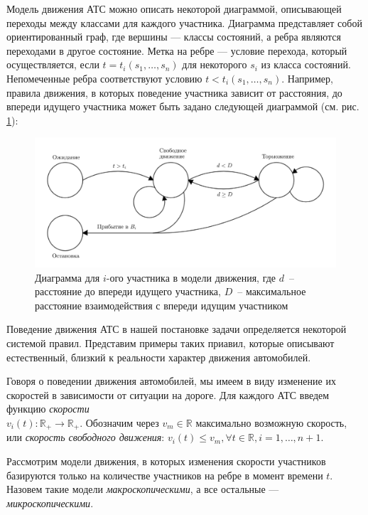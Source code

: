 \documentclass[12pt, a4paper]{article}
\begin{document}
Модель движения АТС можно описать некоторой диаграммой, описывающей переходы между классами для каждого участника. Диаграмма представляет собой ориентированный граф, где вершины --- классы состояний, а ребра являются переходами в другое состояние. Метка на ребре --- условие перехода, который осуществляется, если $t =  t_i(s_1, \dots, s_n)$ для некоторого $s_i$ из класса состояний. Непомеченные ребра соответствуют условию $t < t_i(s_1, \dots, s_n)$. Например, правила движения, в которых поведение участника зависит от расстояния, до впереди идущего участника может быть задано следующей диаграммой (см. рис. \ref{ris:example_diag}):

\begin{figure}[H]
	\centering
	\includegraphics[scale=0.25]{Mur.png}
	\caption{Диаграмма для $i$-ого участника в модели движения, где $d$~-- расстояние до впереди идущего участника, $D$~-- максимальное расстояние взаимодействия с впереди идущим участником}
	\label{ris:example_diag}
\end{figure}

Поведение движения АТС в нашей постановке задачи определяется некоторой системой правил. Представим примеры таких приавил, которые описывают естественный, близкий к реальности характер движения автомобилей.

Говоря о поведении движения автомобилей, мы имеем в виду изменение их скоростей в зависимости от ситуации на дороге. Для каждого АТС введем функцию \textit{скорости} \\ ${v_i(t) : \mathbb {R}_+ \rightarrow \mathbb {R}_+}$.  Обозначим через $v_m \in \mathbb {R}$ максимально возможную скорость, или \textit{скорость свободного движения}: $v_i(t) \leq v_m, \forall t \in \mathbb {R}, i = 1, \dots, n+1$.
\fi

Рассмотрим модели движения, в которых изменения скорости участников базируются только на количестве участников на ребре в момент времени $t$. Назовем такие модели \textit{макроскопическими}, а все остальные --- \textit{микроскопическими}. 
\end{document}
